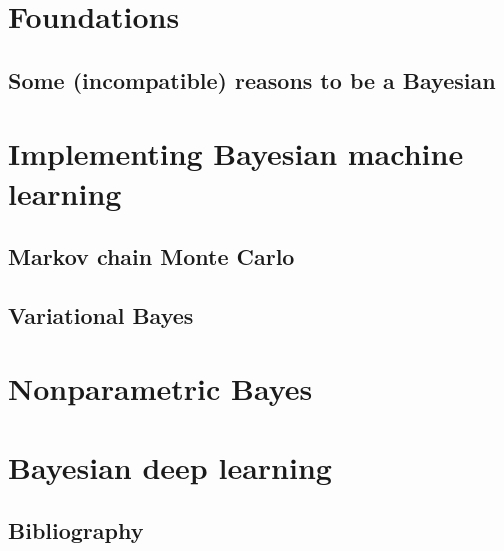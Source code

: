 \documentclass[11pt,fleqn]{book} %
\begin{document}
\part{Foundations}
    \label{ch:foundations}
    \chapter{Some (incompatible) reasons to be a Bayesian}
    

\part{Implementing Bayesian machine learning}
    \chapter{Markov chain Monte Carlo}
    
    \chapter{Variational Bayes}
    

\part{Nonparametric Bayes}
\part{Bayesian deep learning}

\chapter*{Bibliography}

\printbibliography[heading=bibempty]

\cleardoublepage %
\setlength{\columnsep}{0.75cm} %
\printindex %
\end{document}
